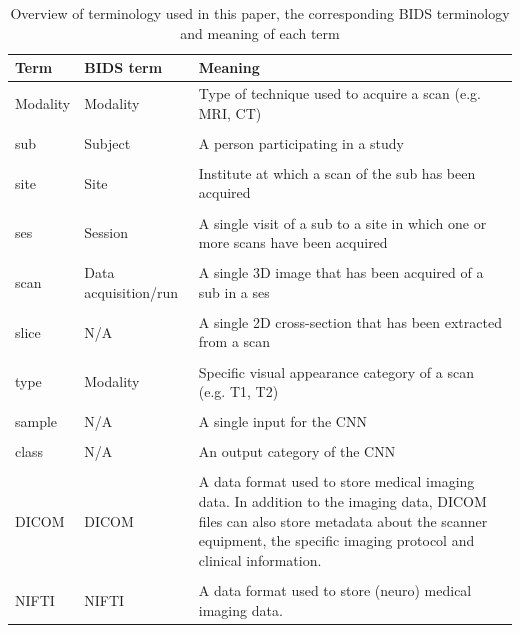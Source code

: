 \begin{table}[htbp]
  \centering

  \begin{tabular}{L{1.5cm}L{3cm}L{6cm}}
  \toprule
  \textbf{Term} & \textbf{\gls{BIDS} term} & \textbf{Meaning}\\
  \midrule
  Modality & Modality & Type of technique used to acquire a \gls{scan} (e.g. \gls{MRI}, \gls{CT})\\
  \\
  \Gls{sub} & Subject & A person participating in a study\\
  \\
  \Gls{site} & Site & Institute at which a \gls{scan} of the \gls{sub} has been acquired\\
  \\
  \Gls{ses} & Session & A single visit of a \gls{sub} to a \gls{site} in which one or more \glspl{scan} have been acquired\\
  \\
  \Gls{scan} & Data acquisition/run & A single 3D image that has been acquired of a \gls{sub} in a \gls{ses}\\
  \\
  \Gls{slice} & N/A & A single 2D cross-section that has been extracted from a \gls{scan}\\
  \\
  \Gls{type} & Modality & Specific visual appearance category of a \gls{scan} (e.g. \gls{T1}, \gls{T2})\\
  \\
  \Gls{sample} & N/A & A single input for the \gls{CNN}\\
  \\
  \Gls{class} & N/A & An output category of the \gls{CNN}\\
  \\
  \gls{DICOM} & DICOM & A data format used to store medical imaging data. In addition to the imaging data, DICOM files can also store metadata about the scanner equipment, the specific imaging protocol and clinical information.\\
  \\
  \gls{NIFTI} & \gls{NIFTI} & A data format used to store (neuro) medical imaging data.\\
  \bottomrule
  \end{tabular}
  \caption{Overview of terminology used in this paper, the corresponding \gls{BIDS} terminology and meaning of each term}\label{tab:terminology}
\end{table}



